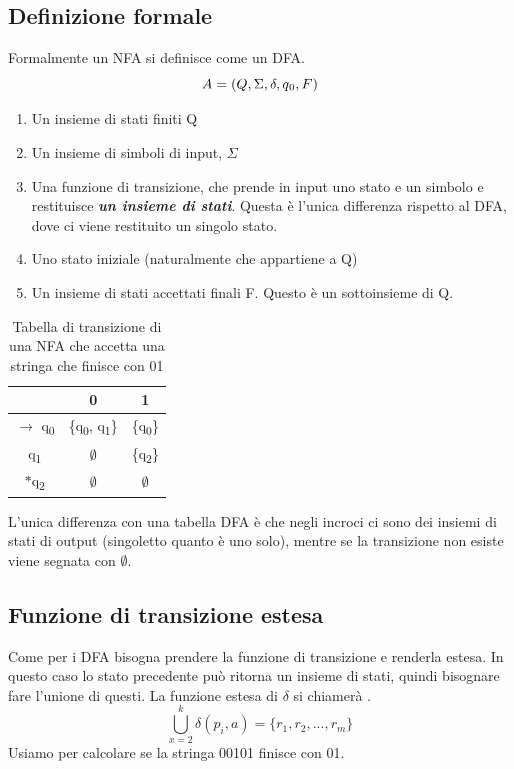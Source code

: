 \documentclass[12pt]{article}
\newcommand{\circumdelta}{%
  \leavevmode\vbox{
    \offinterlineskip
    \ialign{%
      \hfil##\hfil\cr
      \^{}\cr\noalign{\vskip-1ex}
      $\delta$\cr
    }
  }%
}
\begin{document}
\newpage
\subsection{Definizione formale}
Formalmente un NFA si definisce come un DFA.
\[A = (Q, \Sigma, \delta, q\textsubscript{0}, F)\]
\begin{enumerate}
	\item Un insieme di stati finiti Q
	\item Un insieme di simboli di input, $\Sigma$
	\item Una funzione di transizione, che prende in input uno stato e un simbolo e restituisce \emph{\textbf{un insieme di stati}}. Questa è l'unica differenza rispetto al DFA, dove ci viene restituito un singolo stato.
	\item Uno stato iniziale (naturalmente che appartiene a Q)
	\item Un insieme di stati accettati finali F. Questo è un sottoinsieme di Q.
\end{enumerate}

\begin{table}[ht]
	\centering
	\begin{tabular}{c || c | c}
		                                 & 0                                          & 1                      \\
		\hline\hline
		$\rightarrow$ q\textsubscript{0} & \{q\textsubscript{0}, q\textsubscript{1}\} & \{q\textsubscript{0}\} \\
		q\textsubscript{1}               & $\emptyset$                                & \{q\textsubscript{2}\} \\
		$*$q\textsubscript{2}            & $\emptyset$                                & $\emptyset$            \\
	\end{tabular}
	\caption{Tabella di transizione di una NFA che accetta una stringa che finisce con 01}
\end{table}
L'unica differenza con una tabella DFA è che negli incroci ci sono dei insiemi di stati di output (singoletto quanto è uno solo), mentre se la transizione non esiste viene segnata con $\emptyset$.

\newpage
\subsection{Funzione di transizione estesa}
Come per i DFA bisogna prendere la funzione di transizione e renderla estesa. In questo caso lo stato precedente può ritorna un insieme di stati, quindi bisognare fare l'unione di questi. La funzione estesa di $\delta$ si chiamerà \circumdelta.
\[\bigcup^k_{x=2}\delta(p_i,a) = \{r_1,r_2,... ,r_m\} \]
Usiamo \circumdelta\space per calcolare se la stringa 00101 finisce con 01.
\end{document}
